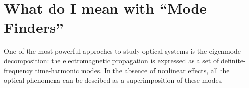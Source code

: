 
\section*{What do I mean with ``Mode Finders''}
One of the most powerful approches to study optical systems is the
eigenmode decomposition: the electromagnetic propagation is expressed
as a set of definite-frequency time-harmonic modes. In the absence of
nonlinear effects, all the optical phenomena can be descibed as a
superimposition of these modes.






